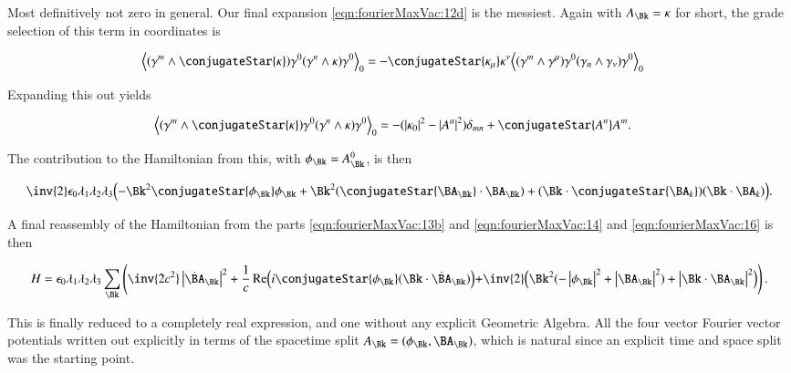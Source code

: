 Most definitively not zero in general.  Our final expansion \autoref{eqn:fourierMaxVac:12d} is the messiest.  Again with $A_\Bk = \kappa$ for short, the grade selection of this term in coordinates is

\begin{align}\label{eqn:fourierMaxVac:15}
\gpgradezero{ (\gamma^m \wedge \conjugateStar{\kappa} ) \gamma^0 (\gamma^n \wedge \kappa ) \gamma^0 }
&=
- \conjugateStar{\kappa_\mu} \kappa^\nu
   \gpgradezero{ (\gamma^m \wedge \gamma^\mu) \gamma^0 (\gamma_n \wedge \gamma_\nu) \gamma^0 }
\end{align}

Expanding this out yields

\begin{align}\label{eqn:fourierMaxVac:15b}
\gpgradezero{ (\gamma^m \wedge \conjugateStar{\kappa} ) \gamma^0 (\gamma^n \wedge \kappa ) \gamma^0 }
&=
- ( \Abs{\kappa_0}^2 - \Abs{A^a}^2 ) \delta_{m n} + \conjugateStar{A^n} A^m.
\end{align}

The contribution to the Hamiltonian from this, with $\phi_\Bk = A^0_\Bk$, is then

\begin{align}\label{eqn:fourierMaxVac:16}
\inv{2} \epsilon_0 \lambda_1 \lambda_2 \lambda_3 
\Bigl(
-\Bk^2 \conjugateStar{\phi_\Bk} \phi_\Bk 
+ \Bk^2 (\conjugateStar{\BA_\Bk} \cdot \BA_\Bk)
+ (\Bk \cdot \conjugateStar{\BA_k}) (\Bk \cdot \BA_k)
\Bigr).
\end{align}

A final reassembly of the Hamiltonian from the parts \autoref{eqn:fourierMaxVac:13b} and \autoref{eqn:fourierMaxVac:14} and \autoref{eqn:fourierMaxVac:16} is then

\begin{align}
\label{eqn:fourierMaxVac:17}
H = 
\epsilon_0 \lambda_1 \lambda_2 \lambda_3 \sum_\Bk
\left(
\inv{2 c^2} \Abs{\dot{\BA}_\Bk}^2
+\frac{1}{c} \Real \Bigl( i \conjugateStar{ \phi_\Bk } (\Bk \cdot \dot{\BA}_\Bk) \Bigl)
+\inv{2}
\Bigl(
\Bk^2 ( -\Abs{\phi_\Bk}^2 + \Abs{\BA_\Bk}^2 ) + \Abs{\Bk \cdot \BA_\Bk}^2
\Bigr)
\right).
\end{align}

This is finally reduced to a completely real expression, and one without any explicit Geometric Algebra.  All the four vector Fourier vector potentials written out explicitly in terms of the spacetime split $A_\Bk = (\phi_\Bk, \BA_\Bk)$, which is natural since an explicit time and space split was the starting point.  

